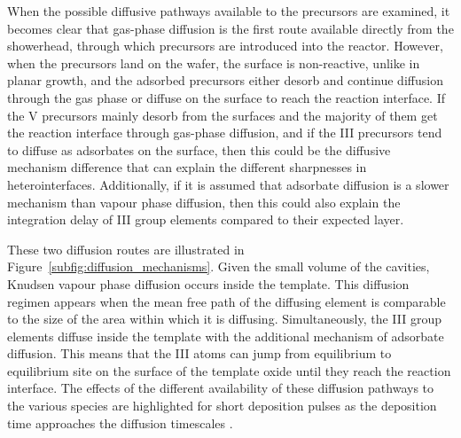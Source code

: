 When the possible diffusive pathways available to the precursors are examined, it becomes clear that gas-phase diffusion is the first route available directly from the showerhead, through which precursors are introduced into the reactor. However, when the precursors land on the wafer, the surface is non-reactive, unlike in planar growth, and the adsorbed precursors either desorb and continue diffusion through the gas phase or diffuse on the surface to reach the reaction interface. If the V precursors mainly desorb from the surfaces and the majority of them get the reaction interface through gas-phase diffusion, and if the III precursors tend to diffuse as adsorbates on the surface, then this could be the diffusive mechanism difference that can explain the different sharpnesses in heterointerfaces. Additionally, if it is assumed that adsorbate diffusion is a slower mechanism than vapour phase diffusion, then this could also explain the integration delay of III group elements compared to their expected layer. 

These two diffusion routes are illustrated in Figure~\ref{subfig:diffusion_mechanisms}. Given the small volume of the cavities, Knudsen vapour phase diffusion occurs inside the template. This diffusion regimen appears when the mean free path of the diffusing element is comparable to the size of the area within which it is diffusing. Simultaneously, the III group elements diffuse inside the template with the additional mechanism of adsorbate diffusion. This means that the III atoms can jump from equilibrium to equilibrium site on the surface of the template oxide until they reach the reaction interface. The effects of the different availability of these diffusion pathways to the various species are highlighted for short deposition pulses as the deposition time approaches the diffusion timescales \cite{Brugnolotto2023}.

